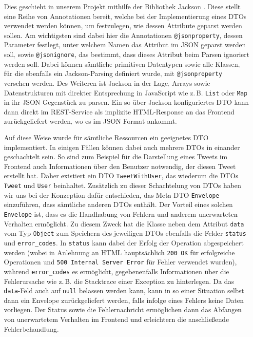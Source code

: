 Dies geschieht in unserem Projekt mithilfe der Bibliothek Jackson \cite{Jackson}. Diese stellt eine Reihe von Annotationen bereit, welche bei der Implementierung eines DTOs verwendet werden können, um festzulegen, wie dessen Attribute geparst werden sollen. Am wichtigsten sind dabei hier die Annotationen \texttt{@jsonproperty}, dessen Parameter festlegt, unter welchem Namen das Attribut im JSON geparst werden soll, sowie \texttt{@jsonignore}, das bestimmt, dass dieses Attribut beim Parsen ignoriert werden soll. Dabei können sämtliche primitiven Datentypen sowie alle Klassen, für die ebenfalls ein Jackson-Parsing definiert wurde, mit \texttt{@jsonproperty} versehen werden. Des Weiteren ist Jackson in der Lage, Arrays sowie Datenstrukturen mit direkter Entsprechung in JavaScript wie z.\,B. \texttt{List} oder \texttt{Map} in ihr JSON-Gegenstück zu parsen. Ein so über Jackson konfiguriertes DTO kann dann direkt im REST-Service als implizite HTML-Response an das Frontend zurückgeliefert werden, wo es im JSON-Format ankommt.

Auf diese Weise wurde für sämtliche Ressourcen ein geeignetes DTO implementiert. In einigen Fällen können dabei auch mehrere DTOs in einander geschachtelt sein. So sind zum Beispiel für die Darstellung eines Tweets im Frontend auch Informationen über den Benutzer notwendig, der diesen Tweet erstellt hat. Daher existiert ein DTO \texttt{TweetWithUser}, das wiederum die DTOs \texttt{Tweet} und \texttt{User} beinhaltet. Zusätzlich zu dieser Schachtelung von DTOs haben wir uns bei der Konzeption dafür entschieden, das Meta-DTO \texttt{Envelope} einzuführen, dass sämtliche anderen DTOs enthält. Der Vorteil eines solchen \texttt{Envelope} ist, dass es die Handhabung von Fehlern und anderem unerwarteten Verhalten ermöglicht. Zu diesem Zweck hat die Klasse neben dem Attribut \texttt{data} vom Typ \texttt{Object} zum Speichern des jeweiligen DTOs ebenfalls die Felder \texttt{status} und \texttt{error\_codes}. In \texttt{status} kann dabei der Erfolg der Operation abgespeichert werden (wobei in Anlehnung an HTML hauptsächlich \texttt{200 OK} für erfolgreiche Operationen und \texttt{500 Internal Server Error} für Fehler verwendet wurden), während \texttt{error\_codes} es ermöglicht, gegebenenfalls Informationen über die Fehlerursache wie z.\,B. die Stacktrace einer Exception zu hinterlegen. Da das \texttt{data}-Feld auch auf \texttt{null} belassen werden kann, kann in so einer Situation selbst dann ein Envelope zurückgeliefert werden, falls infolge eines Fehlers keine Daten vorliegen. Der Status sowie die Fehlernachricht ermöglichen dann das Abfangen von unerwartetem Verhalten im Frontend und erleichtern die anschließende Fehlerbehandlung.

